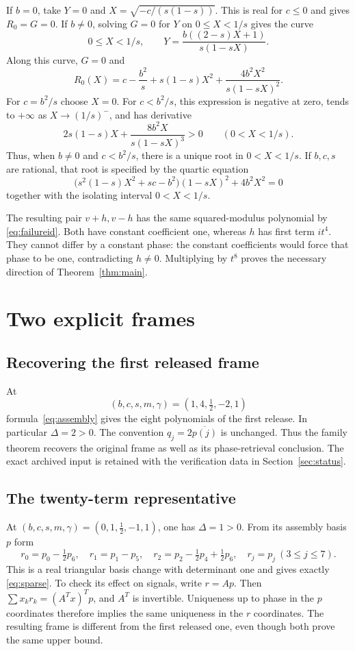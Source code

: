 \documentclass[11pt,a4paper]{article}
\begin{document}
If $b=0$, take $Y=0$ and $X=\sqrt{-c/(s(1-s))}$.
This is real for $c\le0$ and gives $R_0=G=0$.
If $b\ne0$, solving $G=0$ for $Y$ on $0\le X<1/s$ gives the curve
\[
 0\le X<1/s,\qquad
 Y=\frac{b((2-s)X+1)}{s(1-sX)}.
\]
Along this curve, $G=0$ and
\begin{equation}\label{eq:curveR}
 R_0(X)=c-\frac{b^2}s+s(1-s)X^2+
             \frac{4b^2X^2}{s(1-sX)^2}.
\end{equation}
For $c=b^2/s$ choose $X=0$. For $c<b^2/s$, this expression is negative
at zero, tends to $+\infty$ as $X\to(1/s)^-$, and has derivative
\[
 2s(1-s)X+\frac{8b^2X}{s(1-sX)^3}>0\qquad(0<X<1/s).
\]
Thus, when $b\ne0$ and $c<b^2/s$, there is a unique root in $0<X<1/s$.
If $b,c,s$ are rational, that root is specified by the quartic equation
\[
 \bigl(s^2(1-s)X^2+sc-b^2\bigr)(1-sX)^2+4b^2X^2=0
\]
together with the isolating interval $0<X<1/s$.

The resulting pair $v+h,v-h$ has the same squared-modulus polynomial by \eqref{eq:failureid}.
Both have constant coefficient one, whereas $h$ has first term $it^4$.
They cannot differ by a constant phase: the constant coefficients would
force that phase to be one, contradicting $h\ne0$.
Multiplying by $t^8$ proves the necessary direction of
Theorem~\ref{thm:main}.

\section{Two explicit frames}\label{sec:examples}
\subsection{Recovering the first released frame}
At
\[
 (b,c,s,m,\gamma)=(1,4,\tfrac12,-2,1)
\]
formula~\eqref{eq:assembly} gives the eight polynomials of the first
release. In particular $\Delta=2>0$.
The convention $q_j=2\overline{p(j)}$ is unchanged. Thus the family theorem
recovers the original frame as well as its phase-retrieval conclusion.
The exact archived input is retained with the verification data in
Section~\ref{sec:status}.

\subsection{The twenty-term representative}
At $(b,c,s,m,\gamma)=(0,1,\tfrac12,-1,1)$, one has $\Delta=1>0$.
From its assembly basis $p$ form
\[
 r_0=p_0-\tfrac12p_6,\quad r_1=p_1-p_5,\quad
 r_2=p_2-\tfrac12p_4+\tfrac12p_6,\quad r_j=p_j\ (3\le j\le7).
\]
This is a real triangular basis change with determinant one and gives exactly
\eqref{eq:sparse}. To check its effect on signals, write $r=Ap$.
Then $\sum x_kr_k=(A^Tx)^Tp$, and $A^T$ is invertible.
Uniqueness up to phase in the $p$ coordinates therefore implies the same
uniqueness in the $r$ coordinates. The resulting frame is different from the first
released one, even though both prove the same upper bound.
\end{document}

